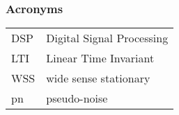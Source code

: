 \subsubsection*{Acronyms}
\begin{tabular}{ll}
   DSP        & Digital Signal Processing \\
   LTI        & Linear Time Invariant     \\
   WSS        & wide sense stationary     \\
   pn         & pseudo-noise
\end{tabular}








